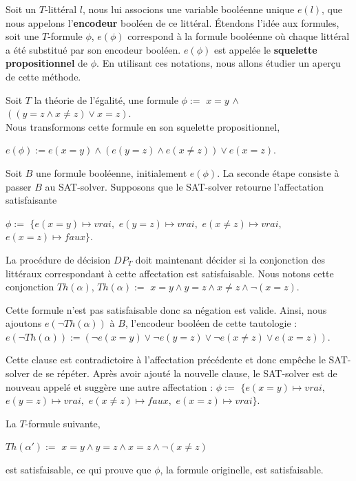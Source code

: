 \documentclass[11pt,openany]{article}
\begin{document}
	 		Soit un $T$-litt\'eral $l$, nous lui associons une variable bool\'eenne unique $e(l)$, que nous appelons l'\textbf{encodeur} bool\'een de ce litt\'eral. \'Etendons l'id\'ee aux formules, soit une $T$-formule $\phi$, $e(\phi)$ correspond \`a la formule bool\'eenne o\`u chaque litt\'eral a \'et\'e substitu\'e par son encodeur bool\'een. $e(\phi)$ est appel\'ee le \textbf{squelette propositionnel} de $\phi$. En utilisant ces notations, nous allons \'etudier un aper\c{c}u de cette m\'ethode.
	 		
	 		Soit $T$ la th\'eorie de l'\'egalit\'e, une formule	$\phi :=$ $x=y$ $\land$ $((y=z\land x\neq z)\lor x=z)$.\\
	 		Nous transformons cette formule en son squelette propositionnel,
	 		
	 		 $e(\phi):= e(x=y)\land (e(y=z)\land e(x\neq z))\lor e(x=z)$.
	 		 
Soit $B$ une formule bool\'eenne, initialement $e(\phi)$. La seconde \'etape consiste \`a passer $B$ au SAT-solver. Supposons que le SAT-solver retourne l'affectation satisfaisante\par
$\phi:=$ $\{e(x=y)\mapsto vrai, $ $e(y=z)\mapsto vrai,$ $e(x\neq z)\mapsto vrai,$ $e(x=z)\mapsto faux\}$.

La proc\'edure de d\'ecision $DP_{T}$ doit maintenant d\'ecider si la conjonction des litt\'eraux correspondant \`a cette affectation est satisfaisable. Nous notons cette conjonction $Th(\alpha)$, $Th(\alpha):=$ $x=y\land y=z\land x\neq z\land \neg(x=z)$.
 
	Cette formule n'est pas satisfaisable donc sa n\'egation est valide. Ainsi, nous ajoutons $e(\neg Th(\alpha))$ \`a $B$, l'encodeur bool\'een de cette tautologie :
 $e(\neg Th(\alpha)) := (\neg e(x=y)\lor\neg e(y=z)\lor\neg e(x\neq z)\lor e(x=z))$.
 
Cette clause est contradictoire \`a l'affectation pr\'ec\'edente et donc emp\^eche le SAT-solver de se r\'ep\'eter. Apr\`es avoir ajout\'e la nouvelle clause, le SAT-solver est de nouveau appel\'e et sugg\`ere une autre affectation :
$\phi:=$ $\{e(x=y)\mapsto vrai, $ $e(y=z)\mapsto vrai,$ $e(x\neq z)\mapsto faux,$ $e(x=z)\mapsto vrai\}$.

La $T$-formule suivante,

 $Th(\alpha ' ):=$ $x=y\land y=z\land x=z\land \neg(x\neq z)$
 
est satisfaisable, ce qui prouve que $\phi$, la formule originelle, est satisfaisable.


\end{document}
